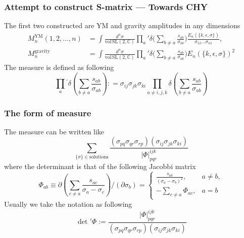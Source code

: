 \documentclass{beamer}
\begin{document}
\fi
\begin{frame}
    \frametitle{Attempt to construct S-matrix --- Towards CHY}
    The first two constructed are YM and gravity amplitudes in any dimensions
    \begin{align*}
        M_n^{\mathrm{YM}}(1,2,\dots,n)&=\int\frac{d^n\sigma}{\mathrm{vol\,SL}(2,\mathbb{C})}\prod_a{'}\delta\bigg(\sum_{b\neq a}\frac{s_{ab}}{\sigma_{ab}}\bigg)\frac{E_n(\{k,\epsilon,\sigma\})}{\sigma_{12}\dots\sigma_{n1}},\\
        M_n^{\mathrm{gravity}}&=\int\frac{d^n\sigma}{\mathrm{vol\,SL}(2,\mathbb{C})}\prod_a{'}\delta\bigg(\sum_{b\neq a}\frac{s_{ab}}{\sigma_{ab}}\bigg)E_n(\{k,\epsilon,\sigma\})^2
    \end{align*}
    The measure is defined as following
    \begin{equation*}
        \prod_{a}{}^{\prime}\delta{\left(\sum_{b\neq a}\frac{s_{ab}}{\sigma_{ab}}\right)}{:}=\sigma_{ij}\sigma_{jk}\sigma_{ki}\prod_{a\neq i,j,k}\delta{\left(\sum_{b\neq a}\frac{s_{ab}}{\sigma_{ab}}\right)}
    \end{equation*}
\end{frame}
\begin{frame}
    \frametitle{The form of measure}
    The measure can be written like
    \begin{equation*}
            \boxed{
            \sum_{\{\sigma\}\in\mathrm{solutions}}\frac{(\sigma_{pq}\sigma_{qr}\sigma_{rp})(\sigma_{ij}\sigma_{jk}\sigma_{ki})}{|\Phi|_{pqr}^{ijk}}}
    \end{equation*}
    where the determinant is that of the following Jacobbi matrix
    \begin{equation*}
        \Phi_{ab}\equiv\partial\left(\sum_{c\neq a}\frac{s_{ac}}{\sigma_a-\sigma_c}\right)/\left(\partial\sigma_b\right)=\begin{cases}\frac{s_{ab}}{(\sigma_a-\sigma_b)^2},&a\neq b,\\-\sum_{c\neq a}\Phi_{ac}, &a=b\end{cases}
    \end{equation*}
    Usually we take the notation as following
    \begin{equation*}
        \boxed{
        \det{'}\Phi:=\frac{|\Phi|_{pqr}^{ijk}}{(\sigma_{pq}\sigma_{qr}\sigma_{rp})(\sigma_{ij}\sigma_{jk}\sigma_{ki})}}
    \end{equation*}
\end{frame}
\end{document}
